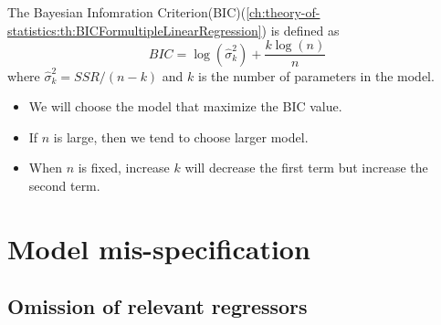 \begin{refsection}
\begin{definition}
	The Bayesian Infomration Criterion(BIC)(\autoref{ch:theory-of-statistics:th:BICFormultipleLinearRegression}) is defined as
	$$BIC = \log(\hat{\sigma}_k^2) + \frac{k\log(n)}{n}$$
	where $\hat{\sigma}_k^2 = SSR/(n-k)$ and $k$ is the number of parameters in the model.
\end{definition}

\begin{remark}\hfill
	\begin{itemize}
		\item We will choose the model that maximize the BIC value.
		\item If $n$ is large, then we tend to choose larger model.
		\item When $n$ is fixed, increase $k$ will decrease the first term but increase the second term.
	\end{itemize}
\end{remark}


\section{Model mis-specification}
\subsection{Omission of relevant regressors}



\end{refsection}
